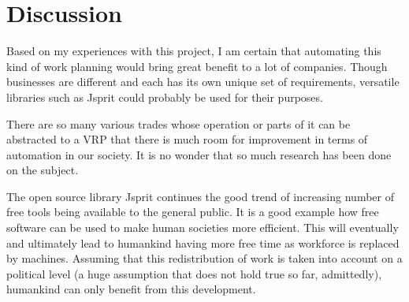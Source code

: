 \chapter{Discussion}
\label{chapter:discussion}

Based on my experiences with this project, I am certain that automating this kind of work planning would bring great benefit to a lot of companies. Though businesses are different and each has its own unique set of requirements, versatile libraries such as Jsprit could probably be used for their purposes.

There are so many various trades whose operation or parts of it can be abstracted to a VRP that there is much room for improvement in terms of automation in our society. It is no wonder that so much research has been done on the subject. 

The open source library Jsprit continues the good trend of increasing number of free tools being available to the general public. It is a good example how free software can be used to make human societies more efficient. This will eventually and ultimately lead to humankind having more free time as workforce is replaced by machines. Assuming that this redistribution of work is taken into account on a political level (a huge assumption that does not hold true so far, admittedly), humankind can only benefit from this development.